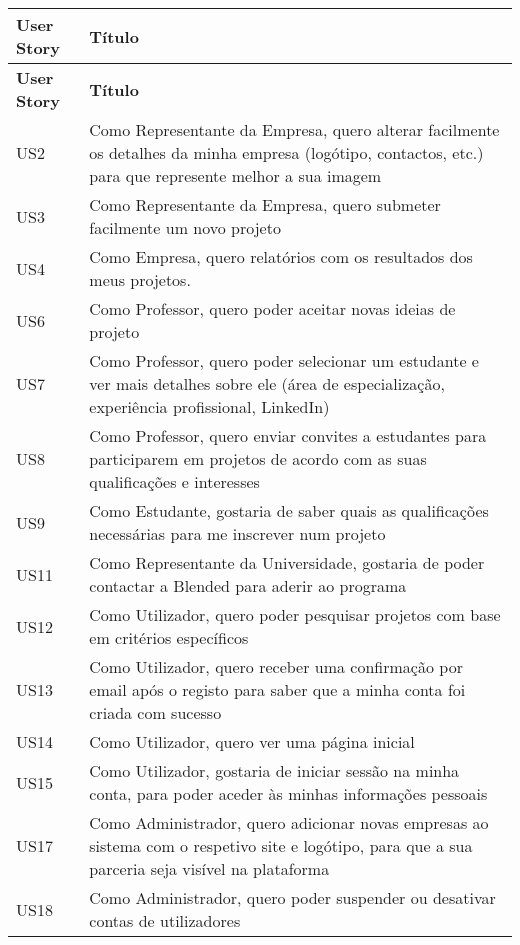 \begin{landscape}
\begin{longtable}{lp{20cm}}
\hline
    \textbf{User Story} & \textbf{Título} \\ \hline
    \endfirsthead

    \hline
    \textbf{User Story} & \textbf{Título} \\ \hline
    \endhead

    US2 & Como Representante da Empresa, quero alterar facilmente os detalhes da minha empresa (logótipo, contactos, etc.) para que represente melhor a sua imagem \\ \hline
    US3 & Como Representante da Empresa, quero submeter facilmente um novo projeto \\ \hline
    US4 & Como Empresa, quero relatórios com os resultados dos meus projetos. \\ \hline
    US6 & Como Professor, quero poder aceitar novas ideias de projeto \\ \hline
    US7 & Como Professor, quero poder selecionar um estudante e ver mais detalhes sobre ele (área de especialização, experiência profissional, LinkedIn) \\ \hline
    US8 & Como Professor, quero enviar convites a estudantes para participarem em projetos de acordo com as suas qualificações e interesses \\ \hline
    US9 & Como Estudante, gostaria de saber quais as qualificações necessárias para me inscrever num projeto \\ \hline
    US11 & Como Representante da Universidade, gostaria de poder contactar a Blended para aderir ao programa \\ \hline
    US12 & Como Utilizador, quero poder pesquisar projetos com base em critérios específicos \\ \hline
    US13 & Como Utilizador, quero receber uma confirmação por email após o registo para saber que a minha conta foi criada com sucesso \\ \hline
    US14 & Como Utilizador, quero ver uma página inicial \\ \hline
    US15 & Como Utilizador, gostaria de iniciar sessão na minha conta, para poder aceder às minhas informações pessoais \\ \hline
    US17 & Como Administrador, quero adicionar novas empresas ao sistema com o respetivo site e logótipo, para que a sua parceria seja visível na plataforma \\ \hline
    US18 & Como Administrador, quero poder suspender ou desativar contas de utilizadores \\ \hline

\end{longtable}
\end{landscape}
